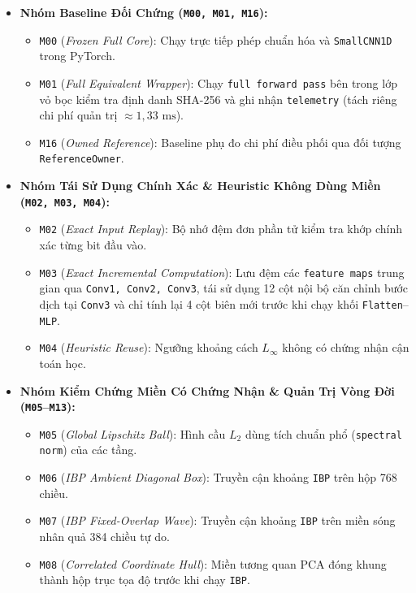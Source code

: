 \documentclass[11pt,a4paper]{article}
\newcommand{\code}[1]{{\small\ttfamily\nolinkurl{#1}}}
\theoremstyle{remark}
\begin{document}
\begin{itemize}
  \item \textbf{Nhóm Baseline Đối Chứng (\code{M00, M01, M16}):}
    \begin{itemize}
      \item \code{M00} (\textit{Frozen Full Core}): Chạy trực tiếp phép chuẩn hóa và \code{SmallCNN1D} trong PyTorch.
      \item \code{M01} (\textit{Full Equivalent Wrapper}): Chạy \code{full forward pass} bên trong lớp vỏ bọc kiểm tra định danh SHA-256 và ghi nhận \code{telemetry} (tách riêng chi phí quản trị $\approx 1,33\text{ ms}$).
      \item \code{M16} (\textit{Owned Reference}): Baseline phụ đo chi phí điều phối qua đối tượng \code{ReferenceOwner}.
    \end{itemize}
  \item \textbf{Nhóm Tái Sử Dụng Chính Xác \& Heuristic Không Dùng Miền (\code{M02, M03, M04}):}
    \begin{itemize}
      \item \code{M02} (\textit{Exact Input Replay}): Bộ nhớ đệm đơn phần tử kiểm tra khớp chính xác từng bit đầu vào.
      \item \code{M03} (\textit{Exact Incremental Computation}): Lưu đệm các \code{feature maps} trung gian qua \code{Conv1, Conv2, Conv3}, tái sử dụng 12 cột nội bộ căn chỉnh bước dịch tại \code{Conv3} và chỉ tính lại 4 cột biên mới trước khi chạy khối \code{Flatten}--\code{MLP}.
      \item \code{M04} (\textit{Heuristic Reuse}): Ngưỡng khoảng cách $L_\infty$ không có chứng nhận cận toán học.
    \end{itemize}
  \item \textbf{Nhóm Kiểm Chứng Miền Có Chứng Nhận \& Quản Trị Vòng Đời (\code{M05}--\code{M13}):}
    \begin{itemize}
      \item \code{M05} (\textit{Global Lipschitz Ball}): Hình cầu $L_2$ dùng tích chuẩn phổ (\code{spectral norm}) của các tầng.
      \item \code{M06} (\textit{IBP Ambient Diagonal Box}): Truyền cận khoảng \code{IBP} trên hộp 768 chiều.
      \item \code{M07} (\textit{IBP Fixed-Overlap Wave}): Truyền cận khoảng \code{IBP} trên miền sóng nhân quả 384 chiều tự do.
      \item \code{M08} (\textit{Correlated Coordinate Hull}): Miền tương quan PCA đóng khung thành hộp trục tọa độ trước khi chạy \code{IBP}.

\end{itemize}
\end{itemize}
\end{document}
